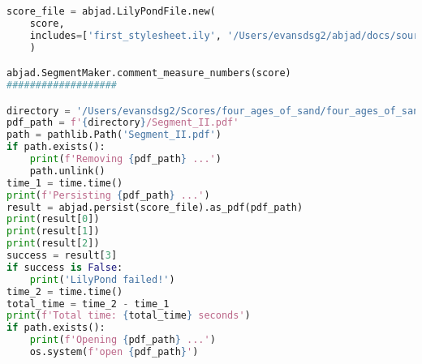 \begin{lstlisting}[language=Python, caption=Four Ages of Sand Segment\_II]
score_file = abjad.LilyPondFile.new(
    score,
    includes=['first_stylesheet.ily', '/Users/evansdsg2/abjad/docs/source/_stylesheets/abjad.ily'],
    )

abjad.SegmentMaker.comment_measure_numbers(score)
###################

directory = '/Users/evansdsg2/Scores/four_ages_of_sand/four_ages_of_sand/Segments/Segment_II'
pdf_path = f'{directory}/Segment_II.pdf'
path = pathlib.Path('Segment_II.pdf')
if path.exists():
    print(f'Removing {pdf_path} ...')
    path.unlink()
time_1 = time.time()
print(f'Persisting {pdf_path} ...')
result = abjad.persist(score_file).as_pdf(pdf_path)
print(result[0])
print(result[1])
print(result[2])
success = result[3]
if success is False:
    print('LilyPond failed!')
time_2 = time.time()
total_time = time_2 - time_1
print(f'Total time: {total_time} seconds')
if path.exists():
    print(f'Opening {pdf_path} ...')
    os.system(f'open {pdf_path}')
\end{lstlisting}
\doublespace

